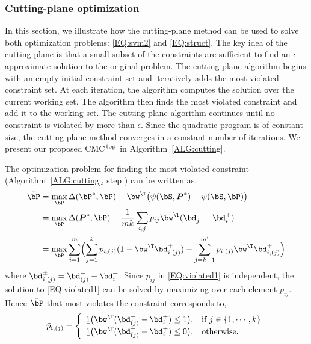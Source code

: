 \documentclass[10pt,twocolumn,letterpaper]{article}
\def\ctwo{{\ding{173}}}
\def\bPbar{{\bar{\bP}}}
\def\mprime{{m^{\prime}}}
\def\bdip{{\bd_{i}^{+}}}
\def\bdjm{{\bd_{j}^{-}}}
\def\bdjbm{{\bd_{(j)}^{-}}}
\def\bPast{{{\boldsymbol P}^{\ast}}}
\def\CMCstruct{{\rm CMC$^{\,\rm top}$}\xspace}
\begin{document}
\subsubsection{Cutting-plane optimization}
In this section, we illustrate how the cutting-plane
method can be used to
solve both optimization problems: \eqref{EQ:svm2} and
\eqref{EQ:struct}.
The key idea of the cutting-plane is that
a small subset of the constraints are sufficient to find an
$\epsilon$-approximate solution to the original problem.
The cutting-plane algorithm begins with an empty initial
constraint set and iteratively adds the most violated constraint set.
At each iteration, the algorithm computes the solution
over the current working set.
The algorithm then finds the most violated constraint
and add it to the working set.
The cutting-plane algorithm continues until no constraint is violated
by more than $\epsilon$.
Since the quadratic program is of constant size, the cutting-plane method
converges in a constant number of iterations.
We present our proposed \CMCstruct in Algorithm~\ref{ALG:cutting}.

The optimization problem for finding the most violated constraint
(Algorithm~\ref{ALG:cutting}, step \ctwo) can be written as,
\begin{align}
    \label{EQ:violated1}
    \bPbar &= \max_{ \bP }  \Delta (\bP^{\ast}, \bP) -
                \bw^\T \bigl( \psi(\bS, \bPast) - \psi(\bS, \bP) \bigr) \\ \notag
           &= \max_{ \bP }  \Delta (\bPast, \bP) - \frac{1}{mk}
         \sum_{i,j}  p_{ij} \bw^\T (\bdjm - \bdip ) \\ \notag
           &= \max_{ \bP } \sum_{i=1}^m \Bigl(
                 \sum_{j=1}^k p_{i,(j)} (1-\bw^\T \bd_{i,(j)}^{\pm}  )
               - \sum_{j=k+1}^\mprime p_{i,(j)} \bw^\T \bd_{i,(j)}^{\pm} \Bigr)
\end{align}
where $\bd_{i,(j)}^{\pm} = \bdjbm - \bdip$.
Since $p_{ij}$ in \eqref{EQ:violated1} is independent,
the solution to \eqref{EQ:violated1} can be solved by maximizing over
each element $p_{ij}$.
Hence $\bPbar$ that most violates the constraint corresponds to,
\begin{align}
  \bar{p}_{i,(j)} = \left\{ \begin{array}{ll}
  \b1 \bigl( \bw^\T (\bdjbm - \bdip) \leq 1 \bigr) , &\mbox{{if   }} j \in \{ 1, \cdots, k \} \\
  \b1 \bigl( \bw^\T (\bdjbm - \bdip) \leq 0 \bigr), &\mbox{{otherwise.}}
\end{array} \right. \notag
\end{align}
\end{document}
